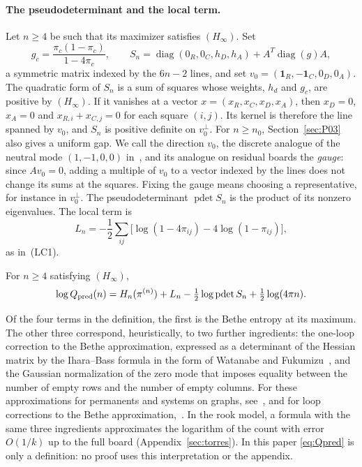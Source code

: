 \paragraph{The pseudodeterminant and the local term.}
Let $n\ge4$ be such that its maximizer satisfies $(H_\infty)$. Set
\begin{equation}\label{eq:gS}
 g_c=\frac{\pi_c(1-\pi_c)}{1-4\pi_c},\qquad
 S_n=\operatorname{diag}(0_R,0_C,h_D,h_A)+A^T\operatorname{diag}(g)A,
\end{equation}
a symmetric matrix indexed by the $6n-2$ lines, and set $v_0=(\mathbf1_R,-\mathbf1_C,0_D,0_A)$. The
quadratic form of $S_n$ is a sum of squares whose weights, $h_d$ and $g_c$, are positive by
$(H_\infty)$. If it vanishes at a vector
$x=(x_R,x_C,x_D,x_A)$, then $x_D=0$, $x_A=0$ and $x_{R,i}+x_{C,j}=0$ for each square $(i,j)$. Its
kernel is therefore the line spanned by $v_0$, and $S_n$ is positive definite on $v_0^\perp$. For
$n\ge n_0$, Section~\ref{sec:P03} also gives a uniform gap. We call the direction $v_0$, the discrete
analogue of the neutral mode $(1,-1,0,0)$
in~\cite[Section~7.2]{Perfil}, and its analogue on residual boards the \emph{gauge}:
since $Av_0=0$, adding a multiple of $v_0$ to a vector indexed by the lines does not change its
sums at the squares. Fixing the gauge means choosing a representative, for instance in $v_0^\perp$. The
pseudodeterminant
$\operatorname{pdet}S_n$ is the product of its nonzero eigenvalues. The local term is
\[
 L_n=-\frac12\sum_{ij}\bigl[\log(1-4\pi_{ij})-4\log(1-\pi_{ij})\bigr],
\]
as in~(LC1).

\begin{definicion}\label{def:Qpred}
For $n\ge4$ satisfying $(H_\infty)$,
\begin{equation}\label{eq:Qpred}
 \log Q_{\rm pred}(n)=H_n(\pi^{(n)})+L_n-\tfrac12\log\operatorname{pdet}S_n+\tfrac12\log(4\pi n).
\end{equation}
\end{definicion}

\begin{observacion}
Of the four terms in the definition, the first is the Bethe entropy at its maximum. The other
three correspond, heuristically, to two further ingredients: the one-loop correction to the
Bethe approximation, expressed as a determinant of the Hessian matrix by the
Ihara--Bass formula in the form of Watanabe and Fukumizu~\cite{Bass,WF}, and the Gaussian normalization of
the
zero mode that imposes equality between the number of empty rows and the number of empty columns. For these
approximations for permanents and systems on graphs, see~\cite{CC,ChertkovYedidia,Vontobel}, and for
loop corrections to the Bethe approximation,~\cite{MontanariRizzo}. In the rook model,
a formula with the same three ingredients approximates the logarithm of the count with error
$O(1/k)$ up to the full board (Appendix~\ref{sec:torres}). In this paper \eqref{eq:Qpred} is
only a definition: no proof uses this interpretation or the appendix.
\end{observacion}

